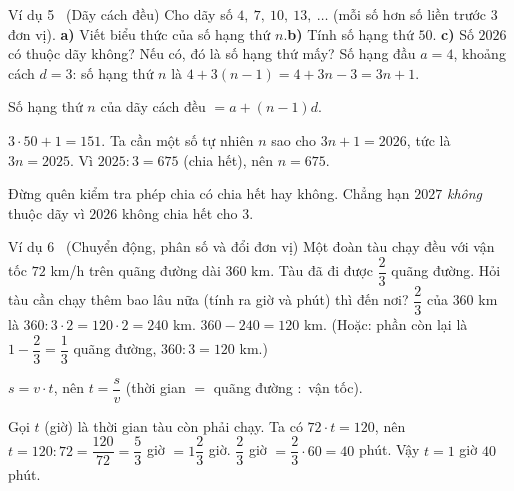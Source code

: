 \begin{exbox}{Ví dụ 5 \ (Dãy cách đều)}
Cho dãy số $4,\ 7,\ 10,\ 13,\ \dots$ (mỗi số hơn số liền trước $3$ đơn vị).
\textbf{a)} Viết biểu thức của số hạng thứ $n$.\quad \textbf{b)} Tính số hạng thứ $50$.\quad
\textbf{c)} Số $2026$ có thuộc dãy không? Nếu có, đó là số hạng thứ mấy?
\guide
{}
Số hạng đầu $a=4$, khoảng cách $d=3$: số hạng thứ $n$ là $4+3(n-1)=4+3n-3=3n+1$.
\begin{recallbox}Số hạng thứ $n$ của dãy cách đều $=a+(n-1)d$.\end{recallbox}
$3\cdot 50+1=151$.
Ta cần một số tự nhiên $n$ sao cho $3n+1=2026$, tức là $3n=2025$. Vì $2025:3=675$ (chia hết), nên $n=675$.
\begin{warnbox}Đừng quên kiểm tra phép chia có chia hết hay không. Chẳng hạn $2027$ \emph{không} thuộc dãy vì $2026$ không chia hết cho $3$.\end{warnbox}
\end{exbox}

\begin{exbox}{Ví dụ 6 \ (Chuyển động, phân số và đổi đơn vị)}
Một đoàn tàu chạy đều với vận tốc $72$ km/h trên quãng đường dài $360$ km. Tàu đã đi được $\dfrac{2}{3}$ quãng đường.
Hỏi tàu cần chạy thêm bao lâu nữa (tính ra giờ và phút) thì đến nơi?
\guide
{}
$\dfrac{2}{3}$ của $360$ km là $360:3\cdot 2=120\cdot 2=240$ km.
$360-240=120$ km. (Hoặc: phần còn lại là $1-\dfrac{2}{3}=\dfrac{1}{3}$ quãng đường, $360:3=120$ km.)
\begin{recallbox}$s=v\cdot t$, nên $t=\dfrac{s}{v}$ (thời gian $=$ quãng đường $:$ vận tốc).\end{recallbox}
Gọi $t$ (giờ) là thời gian tàu còn phải chạy. Ta có $72\cdot t=120$, nên
$t=120:72=\dfrac{120}{72}=\dfrac{5}{3}$ giờ $=1\dfrac{2}{3}$ giờ.
$\dfrac{2}{3}$ giờ $=\dfrac{2}{3}\cdot 60=40$ phút. Vậy $t=1$ giờ $40$ phút.
\end{exbox}

